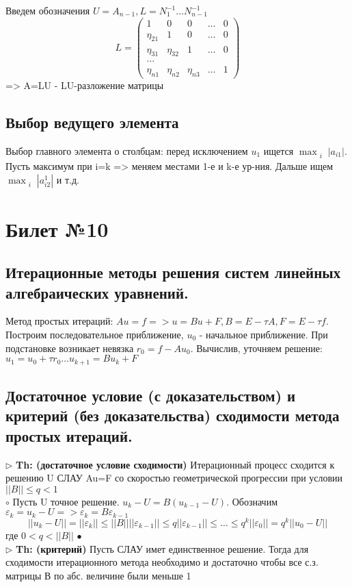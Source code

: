 \documentclass[a4paper]{article}
\begin{document}
Введем обозначения $U=A_{n-1}, L=N_1^{-1}\ldots N_{n-1}^{-1}$
$$ L = \begin{pmatrix}
1 & 0 & 0 & \ldots & 0 \\
\eta_{21} & 1 & 0 & \ldots & 0 \\
\eta_{31} & \eta_{32} & 1 & \ldots & 0 \\
\ldots \\
\eta_{n1} & \eta_{n2} & \eta_{n3} & \ldots & 1
\end{pmatrix} $$
=> A=LU - LU-разложение матрицы

\subsection{Выбор ведущего элемента}
Выбор главного элемента о столбцам: перед исключением $u_1$ ищется $\max_{\substack{i}} |a_{i1}|$. Пусть максимум при i=k => меняем местами 1-е и k-е ур-ния. Дальше ищем $\max_{\substack{i}} |a_{i2}^1|$ и т.д.

\section{Билет №10}
\subsection{Итерационные методы решения систем линейных алгебраических уравнений.}
Метод простых итераций: $Au=f => u=Bu+F, B=E- \tau A, F=E-\tau f$. Построим последовательное приближение, $u_0$ - начальное приближение. При подстановке возникает невязка $r_0=f-Au_0$. Вычислив, уточняем решение: $u_1=u_0+\tau r_0 \ldots u_{k+1}=Bu_k+F$

\subsection{Достаточное условие (с доказательством) и критерий (без доказательства) сходимости метода простых итераций.}
$\triangleright$ \textbf{Th: (достаточное условие сходимости)} Итерационный процесс сходится к решению U СЛАУ Au=F со скоростью геометрической прогрессии при условии $||B|| \leq q <1$ \\
	$\circ$ 
	Пусть U точное решение. $ u_k-U=B(u_{k-1}-U)$. Обозначим $\varepsilon_k = u_k-U => \varepsilon_k=B\varepsilon_{k-1}$
	$$ ||u_k-U|| = ||\varepsilon_k|| \leq ||B|| ||\varepsilon_{k-1}|| \leq q||\varepsilon_{k-1}|| \leq \ldots \leq q^k||\varepsilon_0||=q^k||u_0-U||$$
	где $0<q<||B||$
	$\bullet$ \\
$\triangleright$ \textbf{Th: (критерий)} Пусть СЛАУ имет единственное решение. Тогда для сходимости итерационного метода необходимо и достаточно чтобы все с.з. матрицы В по абс. величине были меньше 1
\end{document}
